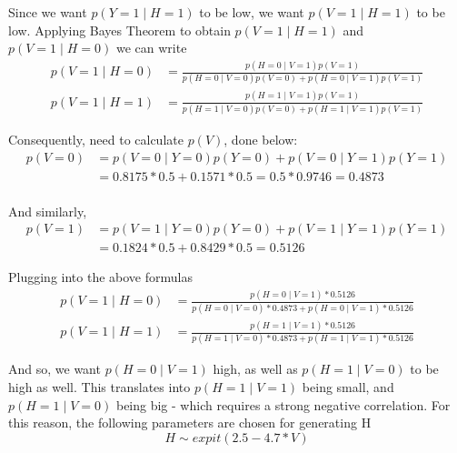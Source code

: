 \documentclass{article}
\begin{document}
Since we want $p(Y = 1 \mid H = 1)$ to be low, we want $p(V = 1 \mid H = 1)$ to be low. Applying Bayes Theorem to obtain $p(V = 1 \mid H = 1)$ and $p(V = 1 \mid H = 0)$ we can write
\begin{align*}
p(V = 1 \mid H = 0) &= \frac{p(H = 0 \mid V = 1)p(V = 1)}{p(H = 0 \mid V = 0)p(V = 0) + p(H = 0 \mid V = 1)p(V = 1)}\\
p(V = 1 \mid H = 1) &= \frac{p(H = 1 \mid V = 1)p(V = 1)}{p(H = 1 \mid V = 0)p(V = 0) + p(H = 1 \mid V = 1)p(V = 1)}
\end{align*}

Consequently, need to calculate $p(V)$, done below:
\begin{align*}
p(V = 0) &= p(V = 0 \mid Y = 0)p(Y = 0) + p(V = 0 \mid Y = 1)p(Y = 1)\\
&= 0.8175*0.5 + 0.1571*0.5 = 0.5*0.9746 = 0.4873\\
\end{align*}

And similarly,
\begin{align*}
p(V = 1) &= p(V = 1 \mid Y = 0)p(Y = 0) + p(V = 1 \mid Y = 1)p(Y = 1)\\
&= 0.1824*0.5 + 0.8429*0.5 = 0.5126
\end{align*}

Plugging into the above formulas
\begin{align*}
p(V = 1 \mid H = 0) &= \frac{p(H = 0 \mid V = 1)*0.5126}{p(H = 0 \mid V = 0)*0.4873 + p(H = 0 \mid V = 1)*0.5126}\\
p(V = 1 \mid H = 1) &= \frac{p(H = 1 \mid V = 1)*0.5126}{p(H = 1 \mid V = 0)*0.4873 + p(H = 1 \mid V = 1)*0.5126}
\end{align*}

And so, we want $p(H = 0 \mid V = 1)$ high, as well as $p(H = 1 \mid V = 0)$ to be high as well. This translates into $p(H = 1 \mid V = 1)$ being small, and $p(H = 1 \mid V = 0)$ being big - which requires a strong negative correlation. For this reason, the following parameters are chosen for generating H
\begin{equation*}
H \sim expit(2.5 - 4.7*V)
\end{equation*}
\end{document}
